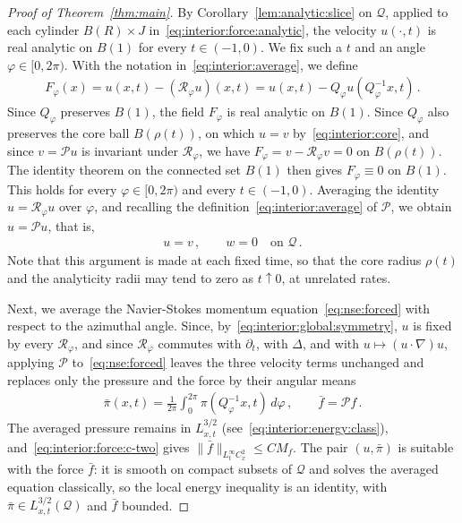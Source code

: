 \documentclass[11pt,reqno]{amsproc}
\numberwithin{equation}{section}
\theoremstyle{remark}
\newcommand{\p}{\partial}
\begin{document}
\begin{proof}[Proof of Theorem~\ref{thm:main}]
By Corollary~\ref{lem:analytic:slice} on $\mathcal Q$, applied to each cylinder $B(R)\times J$ in~\eqref{eq:interior:force:analytic}, the velocity $u(\cdot,t)$ is real analytic on $B(1)$ for every $t\in(-1,0)$. We fix such a $t$ and an angle $\varphi\in[0,2\pi)$. With the notation in~\eqref{eq:interior:average}, we define
\begin{align}
F_\varphi(x)=u(x,t)-(\mathscr R_\varphi u)(x,t)=u(x,t)-Q_\varphi u(Q_\varphi^{-1}x,t)
\,.
\label{eq:interior:defect}
\end{align}
Since $Q_\varphi$ preserves $B(1)$, the field $F_\varphi$ is real analytic on $B(1)$. Since $Q_\varphi$ also preserves the core ball $B(\rho(t))$, on which $u=v$ by~\eqref{eq:interior:core}, and since $v=\mathcal Pu$ is invariant under $\mathscr R_\varphi$, we have $F_\varphi=v-\mathscr R_\varphi v=0$ on $B(\rho(t))$. The identity theorem on the connected set $B(1)$ then gives $F_\varphi\equiv0$ on $B(1)$. This holds for every $\varphi\in[0,2\pi)$ and every $t\in(-1,0)$. Averaging the identity $u=\mathscr R_\varphi u$ over $\varphi$, and recalling the definition~\eqref{eq:interior:average} of $\mathcal P$, we obtain $u=\mathcal Pu$, that is,
\begin{align}
u=v\,,\qquad w=0
\quad\mbox{on }\mathcal Q
\,.
\label{eq:interior:global:symmetry}
\end{align}
Note that this argument is made at each fixed time, so that the core radius $\rho(t)$ and the analyticity radii may tend to zero as $t\uparrow0$, at unrelated rates.

Next, we average the Navier-Stokes momentum equation~\eqref{eq:nse:forced} with respect to the azimuthal angle. Since, by~\eqref{eq:interior:global:symmetry}, $u$ is fixed by every $\mathscr R_\varphi$, and since $\mathscr R_\varphi$ commutes with $\p_t$, with $\Delta$, and with $u\mapsto(u\cdot\nabla)u$, applying $\mathcal P$ to~\eqref{eq:nse:forced} leaves the three velocity terms unchanged and replaces only the pressure and the force by their angular means
\begin{align*}
\bar\pi(x,t)=\frac1{2\pi}\int_0^{2\pi}\pi(Q_\varphi^{-1}x,t)\,d\varphi
\,,\qquad
\bar f=\mathcal Pf
\,.
\end{align*}
The averaged pressure remains in $L^{3/2}_{x,t}$ (see~\eqref{eq:interior:energy:class}), and~\eqref{eq:interior:force:c-two} gives $\|\bar f\|_{L^\infty_tC_x^2}\le CM_f$. The pair $(u,\bar\pi)$ is suitable with the force $\bar f$: it is smooth on compact subsets of $\mathcal Q$ and solves the averaged equation classically, so the local energy inequality is an identity, with $\bar\pi\in L^{3/2}_{x,t}(\mathcal Q)$ and $\bar f$ bounded.


\end{proof}
\end{document}
